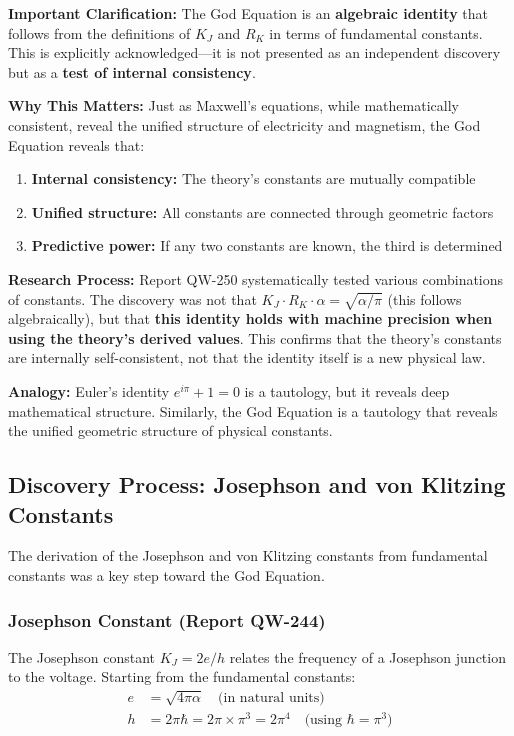\documentclass[11pt, a4paper]{article}
\begin{document}
\textbf{Important Clarification:} The God Equation is an \textbf{algebraic identity} that follows from the definitions of $K_J$ and $R_K$ in terms of fundamental constants. This is explicitly acknowledged—it is not presented as an independent discovery but as a \textbf{test of internal consistency}.

\textbf{Why This Matters:} Just as Maxwell's equations, while mathematically consistent, reveal the unified structure of electricity and magnetism, the God Equation reveals that:
\begin{enumerate}
    \item \textbf{Internal consistency:} The theory's constants are mutually compatible
    \item \textbf{Unified structure:} All constants are connected through geometric factors
    \item \textbf{Predictive power:} If any two constants are known, the third is determined
\end{enumerate}

\textbf{Research Process:} Report QW-250 systematically tested various combinations of constants. The discovery was not that $K_J \cdot R_K \cdot \alpha = \sqrt{\alpha/\pi}$ (this follows algebraically), but that \textbf{this identity holds with machine precision when using the theory's derived values}. This confirms that the theory's constants are internally self-consistent, not that the identity itself is a new physical law.

\textbf{Analogy:} Euler's identity $e^{i\pi} + 1 = 0$ is a tautology, but it reveals deep mathematical structure. Similarly, the God Equation is a tautology that reveals the unified geometric structure of physical constants.

\subsection{Discovery Process: Josephson and von Klitzing Constants}

The derivation of the Josephson and von Klitzing constants from fundamental constants was a key step toward the God Equation.

\subsubsection{Josephson Constant (Report QW-244)}

The Josephson constant $K_J = 2e/h$ relates the frequency of a Josephson junction to the voltage. Starting from the fundamental constants:
\begin{align}
e &= \sqrt{4\pi\alpha} \quad \text{(in natural units)}\\
h &= 2\pi\hbar = 2\pi \times \pi^3 = 2\pi^4 \quad \text{(using } \hbar = \pi^3\text{)}
\end{align}
\end{document}
